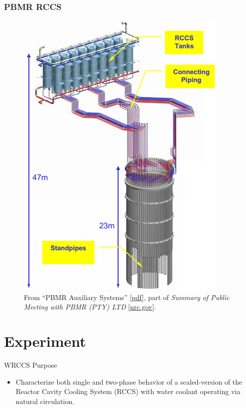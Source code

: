 \documentclass[10pt,t,xcolor=table]{UWMadBeamer}
\begin{document}
    \begin{frame}
        \frametitle{PBMR RCCS}
        \begin{figure}%
        \centering
        \caption{From ``PBMR Auxiliary Systems'' [\href{http://pbadupws.nrc.gov/docs/ML0606/ML060680134.pdf}{\scriptsize pdf}], part of \textit{Summary of Public Meeting with PBMR (PTY) LTD} [\href{http://pbadupws.nrc.gov/docs/ML0607/ML060750210.html}{\scriptsize  nrc.gov}].}
        \includegraphics[keepaspectratio,height=0.62\paperheight]{RCCS_PBMR}
        \end{figure}
    \end{frame}


\section{Experiment}

\begin{frame}{WRCCS Purpose}
    \begin{itemize}
        \item Characterize both single and two-phase behavior of a scaled-version of the Reactor Cavity Cooling System (RCCS) with water coolant operating via natural circulation.
    \end{itemize}
\end{frame}
\end{document}
